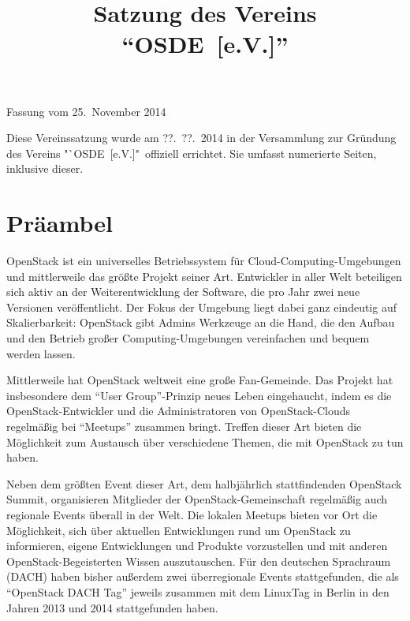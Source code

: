 \documentclass[draft]{scrartcl}
\newcommand{\VereinsName}{OSDE}
\begin{document}

\title{Satzung des Vereins "`\VereinsName\ [e.V.]"'}
\date{}
\author{}
\def\fassungsdatum{25.\ November 2014}

\begin{center}
  \LARGE \thetitle
\end{center}

\begin{flushright}
  Fassung vom \fassungsdatum
\end{flushright}

\pagestyle{scrheadings}
\clearscrheadfoot
{}

{\footnotesize Diese Vereinssatzung wurde am ??.\ ??.\ 2014 in der Versammlung
  zur Gründung des Vereins "`\VereinsName\ [e.V.]"\ offiziell errichtet. Sie
  umfasst \pageref{TotPages} numerierte Seiten, inklusive dieser.}

\bigskip

\section*{Präambel}\enlargethispage{\textheight}
\small

OpenStack ist ein universelles Betriebssystem für Cloud-Computing-Umgebungen
und mittlerweile das größte Projekt seiner Art. Entwickler in aller Welt
beteiligen sich aktiv an der Weiterentwicklung der Software, die pro Jahr
zwei neue Versionen veröffentlicht. Der Fokus der Umgebung liegt dabei ganz
eindeutig auf Skalierbarkeit: OpenStack gibt Admins Werkzeuge an die Hand,
die den Aufbau und den Betrieb großer Computing-Umgebungen vereinfachen
und bequem werden lassen.

Mittlerweile hat OpenStack weltweit eine große Fan-Gemeinde. Das Projekt hat
insbesondere dem "`User Group"'-Prinzip neues Leben eingehaucht, indem es die
OpenStack-Entwickler und die Administratoren von OpenStack-Clouds regelmäßig
bei "`Meetups"' zusammen bringt. Treffen dieser Art bieten die Möglichkeit
zum Austausch über verschiedene Themen, die mit OpenStack zu tun haben.

Neben dem größten Event dieser Art, dem halbjährlich stattfindenden OpenStack
Summit, organisieren Mitglieder der OpenStack-Gemeinschaft regelmäßig auch
regionale Events überall in der Welt. Die lokalen Meetups bieten vor Ort
die Möglichkeit, sich über aktuellen Entwicklungen rund um OpenStack zu
informieren, eigene Entwicklungen und Produkte vorzustellen und mit anderen
OpenStack-Begeisterten Wissen auszutauschen. Für den deutschen Sprachraum
(DACH) haben bisher außerdem zwei überregionale Events stattgefunden, die
als "`OpenStack DACH Tag"' jeweils zusammen mit dem LinuxTag in Berlin in
den Jahren 2013 und 2014 stattgefunden haben.
\end{document}
